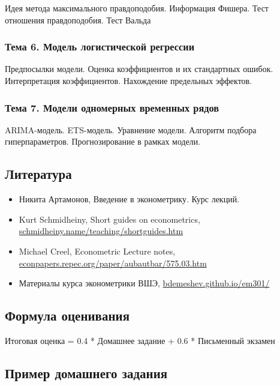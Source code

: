\documentclass[11pt,russian,]{article}
\begin{document}
Идея метода максимального правдоподобия. Информация Фишера. Тест
отношения правдоподобия. Тест Вальда

\hypertarget{-6.---}{%
\subsubsection{Тема 6. Модель логистической регрессии}\label{-6.---}}

Предпосылки модели. Оценка коэффициентов и их стандартных ошибок.
Интерпретация коэффициентов. Нахождение предельных эффектов.

\hypertarget{-7.----}{%
\subsubsection{Тема 7. Модели одномерных временных
рядов}\label{-7.----}}

ARIMA-модель. ETS-модель. Уравнение модели. Алгоритм подбора
гиперпараметров. Прогнозирование в рамках модели.

\subsection{Литература}

\begin{itemize}
\item
  Никита Артамонов, Введение в эконометрику. Курс лекций.
\item
  Kurt Schmidheiny, Short guides on econometrics,
  \href{http://schmidheiny.name/teaching/shortguides.htm}{schmidheiny.name/teaching/shortguides.htm}
\item
  Michael Creel, Econometric Lecture notes,
  \href{http://econpapers.repec.org/paper/aubautbar/575.03.htm}{econpapers.repec.org/paper/aubautbar/575.03.htm}
\item
  Материалы курса эконометрики ВШЭ,
  \href{https://bdemeshev.github.io/em301/}{bdemeshev.github.io/em301/}
\end{itemize}

\hypertarget{-}{%
\subsection{Формула оценивания}\label{-}}

Итоговая оценка = 0.4 * Домашнее задание + 0.6 * Письменный экзамен

\hypertarget{--}{%
\subsection{Пример домашнего задания}\label{--}}
\end{document}
